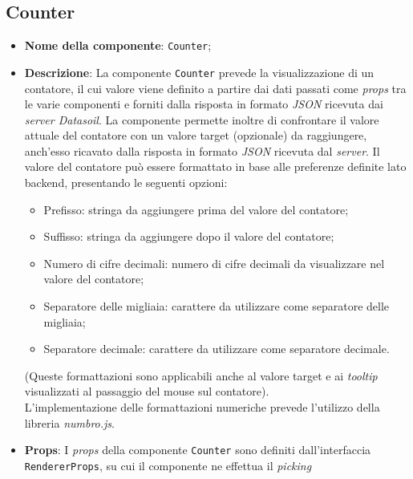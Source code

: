 \subsection{Counter}
\begin{itemize}
      \item \textbf{Nome della componente}: \texttt{Counter};
      \item \textbf{Descrizione}: La componente \texttt{Counter} prevede la visualizzazione di un contatore, il cui valore viene definito a partire dai dati passati
            come \textit{props} tra le varie componenti e forniti dalla risposta in formato \textit{JSON} ricevuta dai \textit{server Datasoil}. \newline
            La componente permette inoltre di confrontare il valore attuale del contatore con un valore target (opzionale) da raggiungere, anch'esso ricavato
            dalla risposta in formato \textit{JSON} ricevuta dal \textit{server}. \newline
            Il valore del contatore può essere formattato in base alle preferenze definite lato backend, presentando le seguenti opzioni:
            \begin{itemize}
                  \label{counter-format}
                  \item Prefisso: stringa da aggiungere prima del valore del contatore;
                  \item Suffisso: stringa da aggiungere dopo il valore del contatore;
                  \item Numero di cifre decimali: numero di cifre decimali da visualizzare nel valore del contatore;
                  \item Separatore delle migliaia: carattere da utilizzare come separatore delle migliaia;
                  \item Separatore decimale: carattere da utilizzare come separatore decimale.
            \end{itemize}
            (Queste formattazioni sono applicabili anche al valore target e ai \textit{tooltip} visualizzati al passaggio del mouse sul contatore).\\
            L'implementazione delle formattazioni numeriche prevede l'utilizzo della libreria \textit{numbro.js}.
      \item \textbf{Props}: I \textit{props} della componente \texttt{Counter} sono definiti dall'interfaccia \\
            \texttt{RendererProps}, su cui il componente ne effettua il \textit{picking}

\end{itemize}
